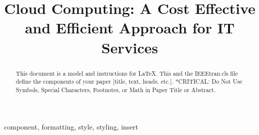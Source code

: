 \documentclass[conference]{IEEEtran}
\begin{document}
\title{\textbf{Cloud Computing: A Cost Effective and Efficient
Approach for IT Services}\\
}

\author{
\and
{}
\and
{}
}

\maketitle

\begin{abstract}
This document is a model and instructions for \LaTeX.
This and the IEEEtran.cls file define the components of your paper [title, text, heads, etc.]. *CRITICAL: Do Not Use Symbols, Special Characters, Footnotes, 
or Math in Paper Title or Abstract.
\end{abstract}

\begin{IEEEkeywords}
component, formatting, style, styling, insert
\end{IEEEkeywords}
\end{document}
